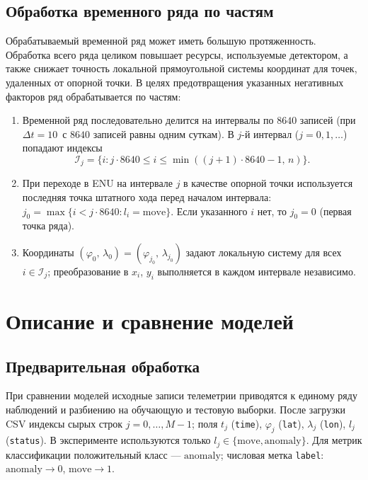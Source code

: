 \documentclass[a4paper,12pt]{report}
\begin{document}
	\subsection{Обработка временного ряда по частям}
	Обрабатываемый временной ряд может иметь большую протяженность. Обработка всего ряда целиком повышает ресурсы, используемые детектором, а также снижает точность локальной прямоугольной системы координат для точек, удаленных от опорной точки. В целях предотвращения указанных негативных факторов ряд обрабатывается по частям:
	\begin{enumerate}
		\item Временной ряд последовательно делится на интервалы по $8640$ записей (при $\Delta t = 10$~с $8640$ записей равны одним суткам). В $j$-й интервал ($j = 0, 1, \ldots$) попадают индексы
		\[
		\mathcal{I}_j = \{i : j \cdot 8640 \leq i \leq \min((j+1)\cdot 8640 - 1,\, n)\}.
		\]
		\item При переходе в ENU на интервале $j$ в качестве опорной точки используется последняя точка штатного хода перед началом интервала: $j_0 = \max\{i < j \cdot 8640 : l_i = \mathrm{move}\}$. Если указанного $i$ нет, то $j_0 = 0$ (первая точка ряда).
		\item Координаты $(\varphi_0,\, \lambda_0) = (\varphi_{j_0},\, \lambda_{j_0})$ задают локальную систему для всех $i \in \mathcal{I}_j$; преобразование в $x_i$, $y_i$ выполняется в каждом интервале независимо.
	\end{enumerate}

	\section{Описание и сравнение моделей}
	\subsection{Предварительная обработка}
	При сравнении моделей исходные записи телеметрии приводятся к единому ряду наблюдений и разбиению на обучающую и тестовую выборки. После загрузки CSV индексы сырых строк $j=0,\ldots,M-1$; поля $t_j$ (\texttt{time}), $\varphi_j$ (\texttt{lat}), $\lambda_j$ (\texttt{lon}), $l_j$ (\texttt{status}). В эксперименте используются только $l_j\in\{\mathrm{move},\mathrm{anomaly}\}$. Для метрик классификации положительный класс --- $\mathrm{anomaly}$; числовая метка \texttt{label}: $\mathrm{anomaly}\rightarrow 0$, $\mathrm{move}\rightarrow 1$.
\end{document}
